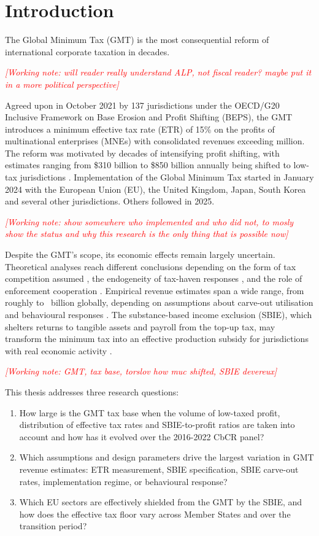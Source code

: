 \documentclass[11pt,a4paper]{article}
\newcommand{\workingnote}[1]{\ifworkingdoc\par\noindent\textcolor{red}{\textit{[Working note: #1]}}\par\fi}
\newcommand{\EUR}{\texteuro}
\begin{document}
\newpage

\section{Introduction}\label{sec:introduction}

The Global Minimum Tax (GMT) is the most consequential reform of international corporate taxation in decades.\workingnote{will reader really understand ALP, not fiscal reader? maybe put it in a more political perspective} Agreed upon in October 2021 by 137 jurisdictions under the OECD/G20 Inclusive Framework on Base Erosion and Profit Shifting (BEPS), the GMT introduces a minimum effective tax rate (ETR) of 15\% on the profits of multinational enterprises (MNEs) with consolidated revenues exceeding \EUR 750 million. The reform was motivated by decades of intensifying profit shifting, with estimates ranging from \$310 billion to \$850 billion annually being shifted to low-tax jurisdictions \citep{torslov2023, garcia-bernardo2024, blouin2023}. Implementation of the Global Minimum Tax started in January 2024 with the European Union (EU), the United Kingdom, Japan, South Korea and several other jurisdictions. Others followed in 2025.\workingnote{show somewhere who implemented and who did not, to mosly show the status and why this research is the only thing that is possible now}

Despite the GMT's scope, its economic effects remain largely uncertain. Theoretical analyses reach different conclusions depending on the form of tax competition assumed \parencite{janeba2023}, the endogeneity of tax-haven responses \parencite{johannesen2022}, and the role of enforcement cooperation \parencite{jean2026}. Empirical revenue estimates span a wide range, from roughly \EUR100 to \EUR180~billion globally, depending on assumptions about carve-out utilisation and behavioural responses \parencite{barake2022}. The substance-based income exclusion (SBIE), which shelters returns to tangible assets and payroll from the top-up tax, may transform the minimum tax into an effective production subsidy for jurisdictions with real economic activity \parencite{schjelderup2024}.

\workingnote{GMT, tax base, torslov how muc shifted, SBIE devereux}

This thesis addresses three research questions:

\begin{enumerate}
\item How large is the GMT tax base when the volume of low-taxed profit, distribution of effective tax rates and SBIE-to-profit ratios are taken into account and how has it evolved over the 2016-2022 CbCR panel?
\item Which assumptions and design parameters drive the largest variation in GMT revenue estimates: ETR measurement, SBIE specification, SBIE carve-out rates, implementation regime, or behavioural response?
\item Which EU sectors are effectively shielded from the GMT by the SBIE, and how does the effective tax floor vary across Member States and over the transition period?
\end{enumerate}
\end{document}
